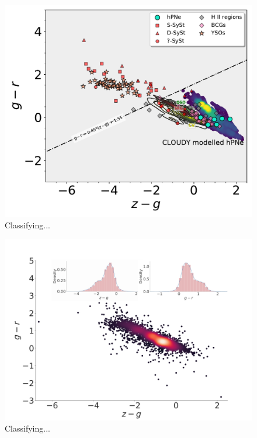 \documentclass[fleqn,usenatbib]{mnras}
\begin{document}
\begin{figure}
	\includegraphics[width=0.9\linewidth]{Figs/Fig-SPLUS-gr-zg.pdf}
    \caption{Classifying...}
    \label{fig:synthetic}
\end{figure}

\begin{figure}
	\includegraphics[width=0.9\linewidth]{Figs/red-blue-colorObjects-gr-edit.jpg}
    \caption{Classifying...}
    \label{fig:new-color}
\end{figure}
\end{document}

